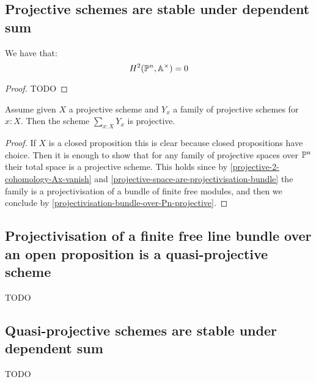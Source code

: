 \subsection{Projective schemes are stable under dependent sum}

\begin{lemma}\label{projective-2-cohomology-Ax-vanish}
We have that:
\[H^2(\mathbb{P}^n,\mathbb{A}^\times) = 0\]
\end{lemma}

\begin{proof}
TODO
\end{proof}

\begin{proposition}
Assume given $X$ a projective scheme and $Y_x$ a family of projective schemes for $x:X$. Then the scheme $\sum_{x:X}Y_x$ is projective.
\end{proposition}

\begin{proof}
If $X$ is a closed proposition this is clear because closed propositions have choice. Then it is enough to show that for any family of projective spaces over $\mathbb{P}^n$ their total space is a projective scheme. This holds since by \cref{projective-2-cohomology-Ax-vanish} and \cref{projective-space-are-projectivisation-bundle} the family is a projectivisation of a bundle of finite free modules, and then we conclude by \cref{projectivisation-bundle-over-Pn-projective}.
\end{proof}

\subsection{Projectivisation of a finite free line bundle over an open proposition is a quasi-projective scheme}

TODO

\subsection{Quasi-projective schemes are stable under dependent sum}

TODO
